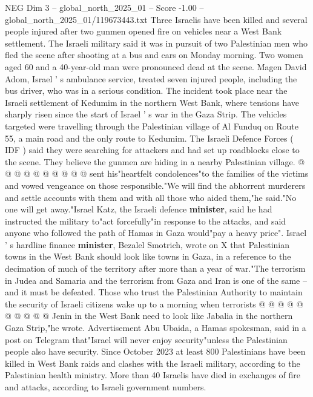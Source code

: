 \begin{textsample}{NEG Dim 3 – global\_north\_2025\_01 – Score -1.00 – global\_north\_2025\_01/119673443.txt}  \label{ex:f3_neg_196}
Three Israelis have been killed and several people injured after two gunmen opened fire on vehicles near a West Bank settlement.
The Israeli military said it was in pursuit of two Palestinian men who fled the scene after shooting at a bus and cars on Monday morning.
Two women aged 60 and a 40-year-old man were pronounced dead at the scene.
Magen David Adom, Israel ' s ambulance service, treated seven injured people, including the bus driver, who was in a serious condition.
The incident took place near the Israeli settlement of Kedumim in the northern West Bank, where tensions have sharply risen since the start of Israel ' s war in the Gaza Strip.
The vehicles targeted were travelling through the Palestinian village of Al Funduq on Route 55, a main road and the only route to Kedumim.
The Israeli Defence Forces ( IDF ) said they were searching for attackers and had set up roadblocks close to the scene.
They believe the gunmen are hiding in a nearby Palestinian village. @ @ @ @ @ @ @ @ @ @ sent his"heartfelt condolences"to the families of the victims and vowed vengeance on those responsible."We will find the abhorrent murderers and settle accounts with them and with all those who aided them,"he said."No one will get away."Israel Katz, the Israeli defence \textbf{minister}, said he had instructed the military to"act forcefully"in response to the attacks, and said anyone who followed the path of Hamas in Gaza would"pay a heavy price".
Israel ' s hardline finance \textbf{minister}, Bezalel Smotrich, wrote on X that Palestinian towns in the West Bank should look like towns in Gaza, in a reference to the decimation of much of the territory after more than a year of war."The terrorism in Judea and Samaria and the terrorism from Gaza and Iran is one of the same -- and it must be defeated.
Those who trust the Palestinian Authority to maintain the security of Israeli citizens wake up to a morning when terrorists @ @ @ @ @ @ @ @ @ @ Jenin in the West Bank need to look like Jabalia in the northern Gaza Strip,"he wrote.
Advertisement Abu Ubaida, a Hamas spokesman, said in a post on Telegram that"Israel will never enjoy security"unless the Palestinian people also have security.
Since October 2023 at least 800 Palestinians have been killed in West Bank raids and clashes with the Israeli military, according to the Palestinian health ministry.
More than 40 Israelis have died in exchanges of fire and attacks, according to Israeli government numbers.

\end{textsample}
